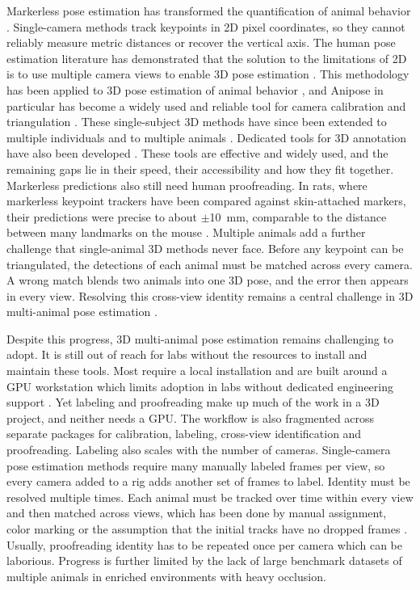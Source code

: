 \documentclass[pdflatex, sn-nature]{sn-jnl}
\theoremstyle{thmstyleone}%
\theoremstyle{thmstyletwo}%
\theoremstyle{thmstylethree}%
\begin{document}
Markerless pose estimation has transformed the quantification of animal behavior \citep{Mathis2018,Pereira2020,Pereira2022,Biderman2024}. Single-camera methods track keypoints in 2D pixel coordinates, so they cannot reliably measure metric distances or recover the vertical axis. The human pose estimation literature has demonstrated that the solution to the limitations of 2D is to use multiple camera views to enable 3D pose estimation \citep{Iskakov2019}. This methodology has been applied to 3D pose estimation of animal behavior \citep{Dunn2021,Karashchuk2021, Daruwalla2026}, and Anipose in particular has become a widely used and reliable tool for camera calibration and triangulation \citep{Karashchuk2021}. These single-subject 3D methods have since been extended to multiple individuals \citep{Huang2020,Chen2020} and to multiple animals \citep{Marshall2021,Marshall2022,Klibaite2025}. Dedicated tools for 3D annotation have also been developed \citep{Hueser2023,Aharon2026}. These tools are effective and widely used, and the remaining gaps lie in their speed, their accessibility and how they fit together. Markerless predictions also still need human proofreading. In rats, where markerless keypoint trackers have been compared against skin-attached markers, their predictions were precise to about $\pm$10~mm, comparable to the distance between many landmarks on the mouse \citep{Marshall2021capture,Ulutas2025}. Multiple animals add a further challenge that single-animal 3D methods never face. Before any keypoint can be triangulated, the detections of each animal must be matched across every camera. A wrong match blends two animals into one 3D pose, and the error then appears in every view. Resolving this cross-view identity remains a central challenge in 3D multi-animal pose estimation \citep{Chen2020,Maree2024}.

Despite this progress, 3D multi-animal pose estimation remains challenging to adopt. It is still out of reach for labs without the resources to install and maintain these tools. Most require a local installation and are built around a GPU workstation which limits adoption in labs without dedicated engineering support \citep{Hueser2023}. Yet labeling and proofreading make up much of the work in a 3D project, and neither needs a GPU. The workflow is also fragmented across separate packages for calibration, labeling, cross-view identification and proofreading. Labeling also scales with the number of cameras. Single-camera pose estimation methods require many manually labeled frames per view, so every camera added to a rig adds another set of frames to label. Identity must be resolved multiple times. Each animal must be tracked over time within every view and then matched across views, which has been done by manual assignment, color marking or the assumption that the initial tracks have no dropped frames \citep{Klibaite2025,Waldmann2024}. Usually, proofreading identity has to be repeated once per camera which can be laborious. Progress is further limited by the lack of large benchmark datasets of multiple animals in enriched environments with heavy occlusion. 
\end{document}
